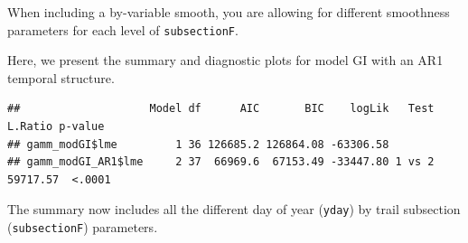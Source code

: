 \documentclass[
]{book}
\begin{document}
When including a by-variable smooth, you are allowing for different smoothness parameters for each level of \texttt{subsectionF}.

Here, we present the summary and diagnostic plots for model GI with an AR1 temporal structure.

\begin{verbatim}
##                    Model df      AIC       BIC    logLik   Test  L.Ratio p-value
## gamm_modGI$lme         1 36 126685.2 126864.08 -63306.58                        
## gamm_modGI_AR1$lme     2 37  66969.6  67153.49 -33447.80 1 vs 2 59717.57  <.0001
\end{verbatim}

The summary now includes all the different day of year (\texttt{yday}) by trail subsection (\texttt{subsectionF}) parameters.
\end{document}
